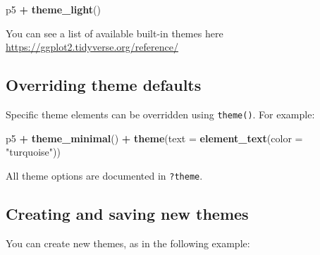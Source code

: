 \documentclass[]{book}
\newenvironment{Shaded}{\begin{snugshade}}{\end{snugshade}}
\newcommand{\KeywordTok}[1]{\textcolor[rgb]{0.13,0.29,0.53}{\textbf{#1}}}
\newcommand{\DataTypeTok}[1]{\textcolor[rgb]{0.13,0.29,0.53}{#1}}
\newcommand{\StringTok}[1]{\textcolor[rgb]{0.31,0.60,0.02}{#1}}
\newcommand{\OperatorTok}[1]{\textcolor[rgb]{0.81,0.36,0.00}{\textbf{#1}}}
\newcommand{\NormalTok}[1]{#1}
\begin{document}
\begin{Shaded}
\begin{Highlighting}[]
\NormalTok{p5 }\OperatorTok{+}\StringTok{ }\KeywordTok{theme_light}\NormalTok{()}
\end{Highlighting}
\end{Shaded}

You can see a list of available built-in themes here
\url{https://ggplot2.tidyverse.org/reference/}

\subsection{Overriding theme defaults}\label{overriding-theme-defaults}

Specific theme elements can be overridden using \texttt{theme()}. For
example:

\begin{Shaded}
\begin{Highlighting}[]
\NormalTok{p5 }\OperatorTok{+}\StringTok{ }\KeywordTok{theme_minimal}\NormalTok{() }\OperatorTok{+}
\StringTok{  }\KeywordTok{theme}\NormalTok{(}\DataTypeTok{text =} \KeywordTok{element_text}\NormalTok{(}\DataTypeTok{color =} \StringTok{"turquoise"}\NormalTok{))}
\end{Highlighting}
\end{Shaded}

All theme options are documented in \texttt{?theme}.

\subsection{Creating and saving new
themes}\label{creating-and-saving-new-themes}

You can create new themes, as in the following example:
\end{document}
